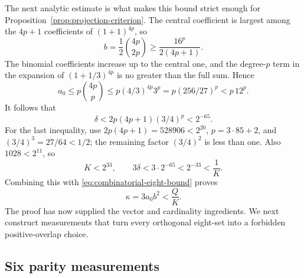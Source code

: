 The next analytic estimate is what makes this bound strict enough for
Proposition~\ref{prop:projection-criterion}.  The central coefficient
is largest among the \(4p+1\) coefficients of \((1+1)^{4p}\), so
\[
 b=\frac12\binom{4p}{2p}\geq\frac{16^p}{2(4p+1)}.
\]
The binomial coefficients increase up to the central one, and the
degree-\(p\) term in the expansion of \((1+1/3)^{4p}\) is no greater
than the full sum.  Hence
\[
 a_0\leq p\binom{4p}{p}
 \leq p(4/3)^{4p}3^p
 =p(256/27)^p
 <p\,12^p.
\]
It follows that
\begin{equation}\label{eq:combinatorial-analytic-bound}
 \delta<2p(4p+1)(3/4)^p<2^{-65}.
\end{equation}
For the last inequality, use \(2p(4p+1)=528906<2^{20}\),
\(p=3\cdot85+2\), and
\((3/4)^3=27/64<1/2\); the remaining factor \((3/4)^2\) is less
than one.  Also \(1028<2^{11}\), so
\[
 K<2^{33},\qquad
 3\delta<3\cdot2^{-65}<2^{-33}<\frac1K.
\]
Combining this with \eqref{eq:combinatorial-eight-bound} proves
\begin{equation}\label{eq:combinatorial-strict-bound}
 \kappa=3a_0b^2<\frac QK.
\end{equation}
The proof has now supplied the vector and cardinality ingredients.
We next construct measurements that turn every orthogonal eight-set
into a forbidden positive-overlap choice.

\subsection{Six parity measurements}

